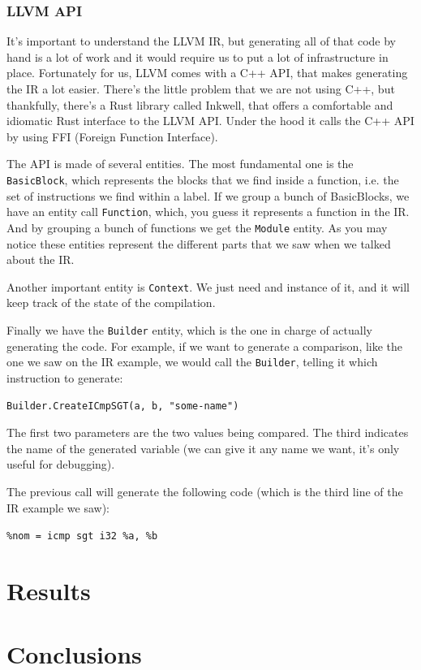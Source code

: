 ﻿\documentclass[10pt,a4paper,twocolumn,twoside]{article}
\begin{document}
\subsubsection{LLVM API}

It's important to understand the LLVM IR, but generating all of that code by 
hand is a lot of work and it would require us to put a lot of infrastructure in
place. Fortunately for us, LLVM comes with a C++ API, that makes generating the
IR a lot easier. There's the little problem that we are not using C++, but 
thankfully, there's a Rust library called Inkwell, that offers a comfortable and 
idiomatic Rust interface to the LLVM API. Under the hood it calls the C++ API
by using FFI (Foreign Function Interface).

The API is made of several entities. The most fundamental one is the
\texttt{BasicBlock}, which represents the blocks that we find inside a function,
i.e. the set of instructions we find within a label. If we group a bunch of
BasicBlocks, we have an entity call \texttt{Function}, which, you guess it 
represents a function in the IR. And by grouping a bunch of functions we get the
\texttt{Module} entity. As you may notice these entities represent the different
parts that we saw when we talked about the IR.

Another important entity is \texttt{Context}. We just need and instance of it, 
and it will keep track of the state of the compilation.

Finally we have the \texttt{Builder} entity, which is the one in charge of 
actually generating the code. For example, if we want to generate a comparison,
like the one we saw on the IR example, we would call the \texttt{Builder}, 
telling it which instruction to generate:

\texttt{Builder.CreateICmpSGT(a, b, "some-name")}

The first two parameters are the two values being compared. The third 
indicates the name of the generated variable (we can give it any name we want,
it's only useful for debugging).

The previous call will generate the following code (which is the third line of
the IR example we saw):

\texttt{\%nom = icmp sgt i32 \%a, \%b}

\section{Results}
\section{Conclusions}
\end{document}

